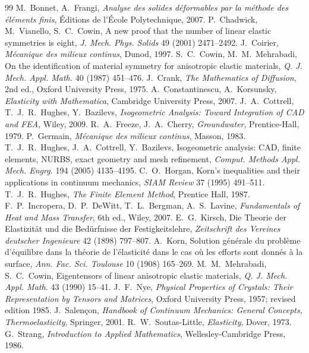 \begin{chapterbib}{99}
 M.~Bonnet, A.~Frangi, \emph{Analyse des solides d\'eformables par la m\'ethode des \'el\'ements finis}, \'Editions de l'\'Ecole Polytechnique, 2007.
 P.~Chadwick, M.~Vianello, S.~C.~Cowin, A new proof that the number of linear elastic symmetries is eight, \emph{J. Mech. Phys. Solids} 49 (2001) 2471--2492.
 J.~Coirier, \emph{M\'ecanique des milieux continus}, Dunod, 1997.
 S.~C.~Cowin, M.~M.~Mehrabadi, On the identification of material symmetry for anisotropic elastic materials, \emph{Q. J. Mech. Appl. Math.} 40 (1987) 451--476.
 J.~Crank, \emph{The Mathematics of Diffusion}, 2nd ed., Oxford University Press, 1975.
 A.~Constantinescu, A.~Korsunsky, \emph{Elasticity with Mathematica}, Cambridge University Press, 2007.
 J.~A.~Cottrell, T.~J.~R.~Hughes, Y.~Bazilevs, \emph{Isogeometric Analysis: Toward Integration of CAD and FEA}, Wiley, 2009.
 R.~A.~Freeze, J.~A.~Cherry, \emph{Groundwater}, Prentice-Hall, 1979.
 P.~Germain, \emph{M\'ecanique des milieux continus}, Masson, 1983.
 T.~J.~R.~Hughes, J.~A.~Cottrell, Y.~Bazilevs, Isogeometric analysis: CAD, finite elements, NURBS, exact geometry and mesh refinement, \emph{Comput. Methods Appl. Mech. Engrg.} 194 (2005) 4135--4195.
 C.~O.~Horgan, Korn's inequalities and their applications in continuum mechanics, \emph{SIAM Review} 37 (1995) 491--511.
 T.~J.~R.~Hughes, \emph{The Finite Element Method}, Prentice Hall, 1987.
 F.~P.~Incropera, D.~P.~DeWitt, T.~L.~Bergman, A.~S.~Lavine, \emph{Fundamentals of Heat and Mass Transfer}, 6th ed., Wiley, 2007.
 E.~G.~Kirsch, Die Theorie der Elastizit\"at und die Bed\"urfnisse der Festigkeitslehre, \emph{Zeitschrift des Vereines deutscher Ingenieure} 42 (1898) 797--807.
 A.~Korn, Solution g\'en\'erale du probl\`eme d'\'equilibre dans la th\'eorie de l'\'elasticit\'e dans le cas o\`u les efforts sont donn\'es \`a la surface, \emph{Ann. Fac. Sci. Toulouse} 10 (1908) 165--269.
 M.~M.~Mehrabadi, S.~C.~Cowin, Eigentensors of linear anisotropic elastic materials, \emph{Q. J. Mech. Appl. Math.} 43 (1990) 15--41.
 J.~F.~Nye, \emph{Physical Properties of Crystals: Their Representation by Tensors and Matrices}, Oxford University Press, 1957; revised edition 1985.
 J.~Salen\c{c}on, \emph{Handbook of Continuum Mechanics: General Concepts, Thermoelasticity}, Springer, 2001.
 R.~W.~Soutas-Little, \emph{Elasticity}, Dover, 1973.
 G.~Strang, \emph{Introduction to Applied Mathematics}, Wellesley-Cambridge Press, 1986.
\end{chapterbib}
